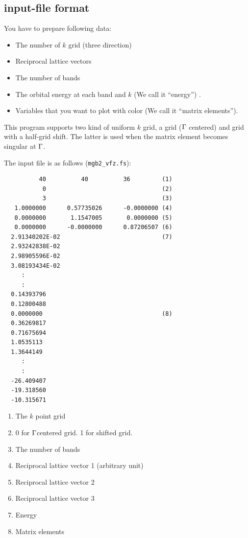 \documentclass[12pt]{article}
\begin{document}
\subsection{input-file format}

You have to prepare following data:
\begin{itemize}
\item The number of $k$ grid (three direction)
\item Reciprocal lattice vectors
\item The number of bands
\item The orbital energy at each band and $k$ (We call it ``energy'') .
\item Variables that you want to plot with color (We call it ``matrix elements'').
\end{itemize}

This program supports two kind of uniform $k$ grid,
a grid (${\rm \Gamma}$ centered) and grid with a half-grid shift.
The latter is used when the matrix element becomes singular 
at ${\rm \Gamma}$.

The input file is as follows (\verb|mgb2_vfz.fs|):

\begin{verbatim}
          40          40          36         (1)
           0                                 (2)
           3                                 (3)
   1.0000000      0.57735026      -0.0000000 (4)
   0.0000000       1.1547005       0.0000000 (5)
   0.0000000      -0.0000000      0.87206507 (6)
  2.91340202E-02                             (7)
  2.93242838E-02
  2.98905596E-02
  3.08193434E-02
     :
     :
  0.14393796
  0.12800488
  0.0000000                                  (8)
  0.36269817
  0.71675694
  1.0535113
  1.3644149
     :
     :
  -26.409407
  -19.318560
  -10.315671
\end{verbatim}

\begin{enumerate}
  \renewcommand{\labelenumi}{(\arabic{enumi})}
  \item The $k$ point grid
  \item 0 for ${\rm \Gamma}$centered grid. 1 for shifted grid.
  \item The number of bands
  \item Reciprocal lattice vector 1 (arbitrary unit)
  \item Reciprocal lattice vector 2
  \item Reciprocal lattice vector 3
  \item Energy
  \item Matrix elements
\end{enumerate}
\end{document}
